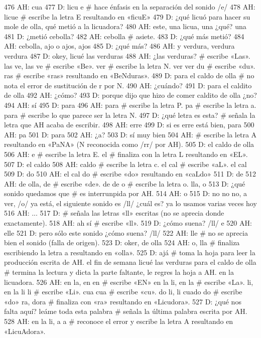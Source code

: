 476 AH: cua
477 D: licu e # hace énfasis en la separación del sonido /e/
478 AH: licue # escribe la letra E resultando en «ficuE»
479 D: ¿qué licuó para hacer su mole de olla, qué metió a la licuadora?
480 AH: este, una licua, una ¿qué? una
481 D: ¿metió cebolla?
482 AH: cebolla # asiete.
483 D: ¿qué más metió?
484 AH: cebolla, ajo o ajos, ajos
485 D: ¿qué más?
486 AH: y verdura, verdura verdura
487 D: okey, licué las verduras
488 AH: ¿las verduras? # escribe «Las». las ve, las ve # escribe «Be». ver # escribe la letra N. ver ver du # escribe «du». ras # escribe «ras» resultando en «BeNduras».
489 D: para el caldo de olla # no nota el error de sustitución de r por N.
490 AH: ¿cuándo?
491 D: para el caldito de olla
492 AH: ¿cómo?
493 D: porque dijo que hizo de comer caldito de olla ¿no?
494 AH: sí
495 D: para
496 AH: para # escribe la letra P. pa # escribe la letra a. para # escribe lo que parece ser la letra N.
497 D: ¿qué letra es esta? # señala la letra que AH acaba de escribir.
498 AH: erre
499 D: si es erre está bien, para
500 AH: pa
501 D: para
502 AH: ¿a?
503 D: sí muy bien
504 AH: # escribe la letra A resultando en «PaNA» (N reconocida como /rr/ por AH).
505 D: el caldo de olla
506 AH: e # escribe la letra E. el # finaliza con la letra L resultando en «EL».
507 D: el caldo
508 AH: caldo # escribe la letra c. el cal # escribe «aL». el cal
509 D: do
510 AH: el cal do # escribe «do» resultando en «caLdo»
511 D: de
512 AH: de olla, de # escribe «de». de de o # escribe la letra o. lla, o
513 D: ¿qué sonido quedamos que # es interrunpida por AH.
514 AH: o
515 D: no no no, a ver, /o/ ya está, el siguiente sonido es /ll/ ¿cuál es? ya lo usamos varias veces hoy
516 AH: ...
517 D: # señala las letras «ll» escritas (no se aprecia donde exactamente).
518 AH: ah sí # escribe «ll».
519 D: ¿cómo suena? /ll/ e   
520 AH: elle
521 D: pero sólo este sonido ¿cómo suena? /ll/
522 AH: lle # no se aprecia bien el sonido (falla de origen).
523 D: oker, de olla
524 AH: o, lla # finaliza escribiendo la letra a resultando en «olla».
525 D: ajá # toma la hoja para leer la producción escrita de AH. el fin de semana licué las verduras para el caldo de olla # termina la lectura y dicta la parte faltante, le regres la hoja a AH. en la licuadora.
526 AH: en la, en en # escribe «EN» en la li, en la # escribe «La». li, en la li li # escribe «Li». cua cua # escribe «cu». do li, li cuado do # escribe «do» ra, dora # finaliza con «ra» resultando en «Licudora».
527 D: ¿qué nos falta aquí? leáme toda esta palabra # señala la última palabra escrita por AH.
528 AH: en la li, a a # reconoce el error y escribe la letra A resultando en «LicuAdora».
